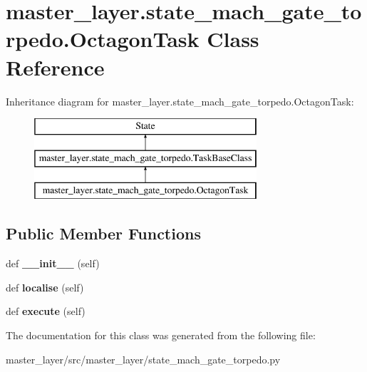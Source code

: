 \hypertarget{classmaster__layer_1_1state__mach__gate__torpedo_1_1OctagonTask}{}\section{master\+\_\+layer.\+state\+\_\+mach\+\_\+gate\+\_\+torpedo.\+Octagon\+Task Class Reference}
\label{classmaster__layer_1_1state__mach__gate__torpedo_1_1OctagonTask}
Inheritance diagram for master\+\_\+layer.\+state\+\_\+mach\+\_\+gate\+\_\+torpedo.\+Octagon\+Task\+:\begin{figure}[H]
\begin{center}
\leavevmode
\includegraphics[height=3.000000cm]{classmaster__layer_1_1state__mach__gate__torpedo_1_1OctagonTask}
\end{center}
\end{figure}
\subsection*{Public Member Functions}
\begin{DoxyCompactItemize}
\item 
\mbox{\label{classmaster__layer_1_1state__mach__gate__torpedo_1_1OctagonTask_a7285cf08473e623a36d1ecf143bf236b}} 
def {\bfseries \+\_\+\+\_\+init\+\_\+\+\_\+} (self)
\item 
\mbox{\label{classmaster__layer_1_1state__mach__gate__torpedo_1_1OctagonTask_a690860c6b63feeffc2daaa1b8cb24c53}} 
def {\bfseries localise} (self)
\item 
\mbox{\label{classmaster__layer_1_1state__mach__gate__torpedo_1_1OctagonTask_a4d5108b47fdc3fb8e529c8ed8d123fd7}} 
def {\bfseries execute} (self)
\end{DoxyCompactItemize}


The documentation for this class was generated from the following file\+:\begin{DoxyCompactItemize}
\item 
master\+\_\+layer/src/master\+\_\+layer/state\+\_\+mach\+\_\+gate\+\_\+torpedo.\+py\end{DoxyCompactItemize}
